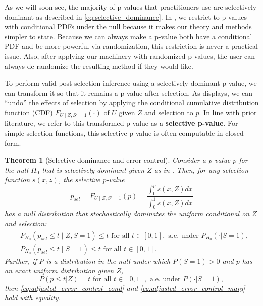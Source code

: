 \documentclass{article}
\newtheorem{theorem}{Theorem}
\begin{document}
As we will soon see, the majority of p-values that practitioners use are selectively dominant as described in \eqref{eq:selective_dominance}. In , we restrict to p-values with conditional PDFs under the null because it makes our theory and methods simpler to state. Because we can always make a p-value both have a conditional PDF and be more powerful via randomization, this restriction is never a practical issue. Also, after applying our machinery with randomized p-values, the user can always de-randomize the resulting method if they would like.

To perform valid post-selection inference using a selectively dominant p-value, we can transform it so that it remains a p-value after selection. As  displays, we can ``undo'' the effects of selection by applying the conditional cumulative distribution function (CDF) $F_{U \mid Z, S' = 1}(\cdot)$ of $U$ given $Z$ and selection to $p$. In line with prior literature, we refer to this transformed p-value as a \textbf{selective p-value}. For simple selection functions, this selective p-value is often computable in closed form. 

\begin{theorem}[Selective dominance and error control]
    \label{thm:adjustment}
    Consider a p-value $p$ for the null $H_0$ that is selectively dominant given $Z$ as in . Then, for any selection function $s(x, z)$, the selective p-value 
    \begin{equation}
    \label{eq:adjustment}
        p_{sel} = F_{U \mid Z, S' = 1}(p) = \frac{\int_0^p s(x, Z) dx}{\int_0^1 s(x, Z) dx}
    \end{equation}
    has a null distribution that stochastically dominates the uniform conditional on $Z$ and selection:
    \begin{align}
        &P_{H_0}(p_{sel} \leq t \mid Z, S= 1) \leq t  \text{ for all } t \in [0, 1], \text{ a.e. under } P_{H_0}(\cdot |S=1), \label{eq:adjusted_error_control_cond} \\
        &P_{H_0}(p_{sel} \leq t\mid S= 1) \leq t \text{ for all } t \in [0, 1]. \label{eq:adjusted_error_control_marg}
    \end{align}
    Further, if $P$ is a distribution in the null under which $P(S=1) > 0$ and $p$ has an exact uniform distribution given $Z$, 
    \begin{equation}
        \label{eq:adjusted_error_control_equality}
        P(p \leq t | Z) = t \text{ for all } t \in [0, 1],  \text{ a.e. under } P(\cdot |S=1), 
    \end{equation}
    then \eqref{eq:adjusted_error_control_cond} and \eqref{eq:adjusted_error_control_marg} hold with equality. 
\end{theorem}
\end{document}

